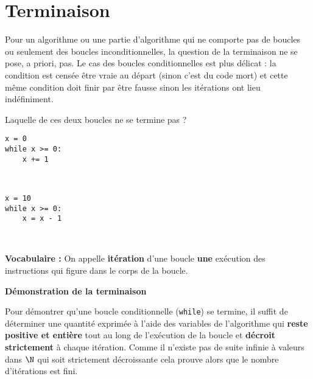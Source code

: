 \section{Terminaison}

Pour un algorithme ou une partie d'algorithme qui ne comporte pas de boucles ou seulement des boucles inconditionnelles, la question de la terminaison ne se pose, a priori, pas. 
Le cas des boucles conditionnelles est plus délicat : la condition est censée être vraie au départ (sinon c'est du code mort) et cette même condition doit finir par être fausse sinon les itérations ont lieu indéfiniment.

\exercice{}

Laquelle de ces deux boucles ne se termine pas ?

\begin{minipage}{0.5\linewidth} %
\begin{minipage}{0.8\linewidth}
\begin{lstlisting}
x = 0
while x >= 0:
    x += 1

\end{lstlisting}
\end{minipage}\,
\begin{minipage}{0.05\linewidth}
\fbox{\thecode}\addtocounter{code}{1}
\end{minipage}
 
\end{minipage}%
\hfill 
\begin{minipage}{0.5\linewidth} 
\begin{minipage}{0.8\linewidth}
\begin{lstlisting}
x = 10
while x >= 0:
    x = x - 1

\end{lstlisting}
\end{minipage}\,
\begin{minipage}{0.05\linewidth}
\fbox{\thecode}\addtocounter{code}{1}
\end{minipage}

\end{minipage}


\vfill

{\bf Vocabulaire : } On appelle {\bf itération} d'une boucle {\bf une} exécution des instructions qui figure dans le corps de la boucle.
\medskip

{\bf Démonstration de la terminaison}
\medskip

Pour démontrer qu'une boucle conditionnelle (\lstinline{while}) se termine, il suffit de déterminer une quantité exprimée à l'aide des variables de l'algorithme qui  {\bf reste positive et entière} tout au long de l'exécution de la boucle et {\bf décroit strictement} à chaque itération.
Comme il n'existe pas de suite infinie à valeurs dans $\N$ qui soit strictement décroissante cela prouve alors que le nombre d'itérations est fini.


